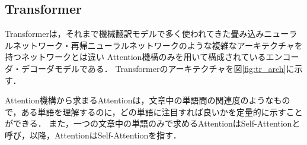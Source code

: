 \documentclass[a4paper, oneside, openany, dvipdfmx]{suribt}%
\newcommand{\fref}[1]{図\ref{#1}}
\begin{document}
\subsection{Transformer}
\label{sec:attention}
Transformerは，それまで機械翻訳モデルで多く使われてきた畳み込みニューラルネットワーク・再帰ニューラルネットワークのような複雑なアーキテクチャを持つネットワークとは違い
Attention機構のみを用いて構成されているエンコーダ・デコーダモデルである\cite{vaswani2017attention}．
Transformerのアーキテクチャを\fref{fig:tr_arch}に示す．

Attention機構から求まるAttentionは，文章中の単語間の関連度のようなもので，ある単語を理解するのに，どの単語に注目すれば良いかを定量的に示すことができる．
また，一つの文章中の単語のみで求めるAttentionはSelf-Attentionと呼び，以降，AttentionはSelf-Attentionを指す．
\end{document}
